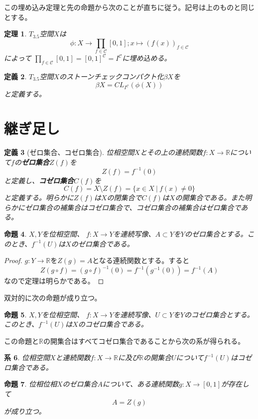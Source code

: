 \documentclass[leqno]{jsarticle}
\newtheorem{thm}{定理}
\newtheorem{prop}[thm]{命題}
\newtheorem{cor}[thm]{系}
\newtheorem{df}[thm]{定義}
\newcommand{\rr}{\mathbb{R}}
\newcommand{\dpst}{\displaystyle}
\begin{document}
この埋め込み定理と先の命題から次のことが直ちに従う。記号は上のものと同じとする。

\begin{thm}
$T_{3.5}$空間$X$は
\[
\phi:X\to\prod_{f\in \mathcal{C}}[0,1]  ;x\mapsto (f(x))_{f\in \mathcal{C}}
\]
によって
$\dpst \prod_{f\in \mathcal{C}}[0,1]=[0,1]^{\mathcal{C}}=I^{\mathcal{C}}$に埋め込める。
\end{thm}
\begin{df}
$T_{3.5}$空間$X$のストーンチェックコンパクト化$\beta X$を
\[
\beta X=CL_{I^{\mathcal{C}}}(\phi (X))
\]
と定義する。
\end{df}


\section{継ぎ足し}
\begin{df}[ゼロ集合、コゼロ集合]
位相空間$X$とその上の連続関数$f:X\to \rr$について$f$の{\bf ゼロ集合}$Z(f)$を
\[
Z(f)=f^{-1}(0)
\]
と定義し、{\bf コゼロ集合}$C(f)$を
\[
C(f)=X\setminus Z(f)=\{x\in X\ |\ f(x)\neq 0\}
\]
と定義する。明らかに$Z(f)$は$X$の閉集合で$C(f)$は$X$の開集合である。また明らかにゼロ集合の補集合はコゼロ集合で、コゼロ集合の補集合はゼロ集合である。
\end{df}

\begin{prop}$X,Y$を位相空間、
$f:X\to Y$を連続写像、$A\subset Y$を$Y$のゼロ集合とする。このとき、$f^{-1}(U)$は$X$のゼロ集合である。
\end{prop}
\begin{proof}
$g:Y\to \rr$を$Z(g)=A$となる連続関数とする。すると
\[
Z(g\circ f)=(g\circ f)^{-1}(0)=f^{-1}(g^{-1}(0))=f^{-1}(A)
\]
なので定理は明らかである。
\end{proof}
双対的に次の命題が成り立つ。
\begin{prop}$X,Y$を位相空間、
$f:X\to Y$を連続写像、$U\subset Y$を$Y$のコゼロ集合とする。このとき、$f^{-1}(U)$は$X$のコゼロ集合である。
\end{prop}
この命題と$\rr$の開集合はすべてコゼロ集合であることから次の系が得られる。
\begin{cor}
位相空間$X$と連続関数$f:X\to \rr$に及び$\rr$の開集合$U$について$f^{-1}(U)$はコゼロ集合である。
\end{cor}


\begin{prop}
位相位相$X$のゼロ集合$A$について、ある連続関数$g:X\to [0,1]$が存在して
\[
A=Z(g)
\]
が成り立つ。
\end{prop}
\end{document}
